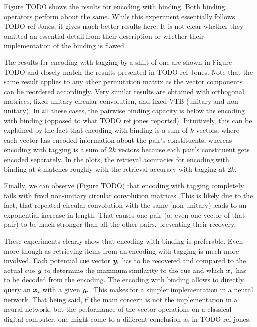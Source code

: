 Figure TODO shows the results for encoding with binding.
Both binding operators perform about the same.
While this experiment essentially follows TODO ref Jones, it gives much better results here.
It is not clear whether they omitted an essential detail from their description or whether their implementation of the binding is flawed.

The results for encoding with tagging by a shift of one are shown in Figure TODO and closely match the results presented in TODO ref Jones.
Note that the same result applies to any other permutation matrix as the vector components can be reordered accordingly.
Very similar results are obtained with orthogonal matrices, fixed unitary circular convolution, and fixed VTB (unitary and non-unitary).
In all these cases, the pairwise binding capacity is below the encoding with binding (opposed to what TODO ref jones reported).
Intuitively, this can be explained by the fact that encoding with binding is a sum of $k$ vectors, where each vector has encoded information about the pair's constituents, whereas encoding with tagging is a sum of $2k$ vectors because each pair's constituent gets encoded separately.
In the plots, the retrieval accuracies for encoding with binding at $k$ matches roughly with the retrieval accuracy with tagging at $2k$.

Finally, we can observe (Figure TODO) that encoding with tagging completely fails with fixed non-unitary circular convolution matrices.
This is likely due to the fact, that repeated circular convolution with the same (non-unitary) leads to an exponential increase in length.
That causes one pair (or even one vector of that pair) to be much stronger than all the other pairs, preventing their recovery.

These experiments clearly show that encoding with binding is preferable.
Even more though as retrieving items from an encoding with tagging is much more involved.
Each potential cue vector $\bm{y}_i$ has to be recovered and compared to the actual cue $\bm{y}$ to determine the maximum similarity to the cue and which $\bm{x}_i$ has to be decoded from the encoding.
The encoding with binding allows to directly query an $\bm{x}_i$ with a given $\bm{y}_i$.
This makes for a simpler implementation in a neural network.
That being said, if the main concern is not the implementation in a neural network, but the performance of the vector operations on a classical digital computer, one might come to a different conclusion as in TODO ref jones.
